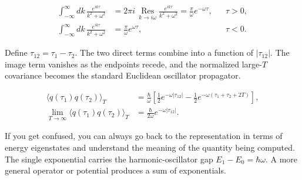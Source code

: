 \begin{align}
  \int_{-\infty}^{\infty}dk\,
  \frac{e^{ik\tau}}{k^2+\omega^2}
  &=2\pi i\,
  \underset{k\to i\omega}{\operatorname{Res}}
  \frac{e^{ik\tau}}{k^2+\omega^2}
  =\frac{\pi}{\omega}e^{-\omega\tau},
  &&\tau>0,
  \label{eq:proposal-positive-time-residue}\\
  \int_{-\infty}^{\infty}dk\,
  \frac{e^{ik\tau}}{k^2+\omega^2}
  &=\frac{\pi}{\omega}e^{\omega\tau},
  &&\tau<0.
  \label{eq:proposal-negative-time-residue}
\end{align}

Define $\tau_{12}=\tau_1-\tau_2$.  The two direct terms combine into a
function of $|\tau_{12}|$.  The image term vanishes as the endpoints recede,
and the normalized large-$T$ covariance becomes the standard Euclidean
oscillator propagator.

\begin{align}
  \langle q(\tau_1)q(\tau_2)\rangle_T
  &=\frac{\hbar}{\omega}
  \left[
    \frac12e^{-\omega|\tau_{12}|}
    -\frac12e^{-\omega(\tau_1+\tau_2+2T)}
  \right],
  \label{eq:proposal-finite-T-result}\\
  \lim_{T\to\infty}
  \langle q(\tau_1)q(\tau_2)\rangle_T
  &=\frac{\hbar}{2\omega}e^{-\omega|\tau_{12}|}.
  \label{eq:proposal-oscillator-propagator}
\end{align}

If you get confused, you can always go back to the representation in terms of
energy eigenstates and understand the meaning of the quantity being computed.
The single exponential carries the harmonic-oscillator gap $E_1-E_0=\hbar
\omega$.  A more general operator or potential produces a sum of exponentials.

